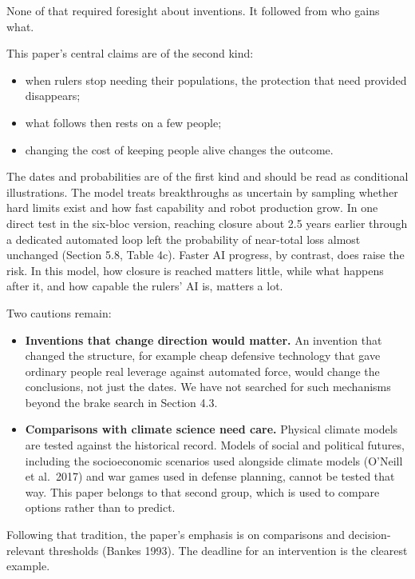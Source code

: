 \documentclass[
  10pt,
]{article}
\providecommand{\tightlist}{%
  \setlength{\itemsep}{0pt}\setlength{\parskip}{0pt}}
\begin{document}
None of that required foresight about inventions. It followed from who gains what.

This paper's central claims are of the second kind:

\begin{itemize}
\tightlist
\item
  when rulers stop needing their populations, the protection that need provided disappears;
\item
  what follows then rests on a few people;
\item
  changing the cost of keeping people alive changes the outcome.
\end{itemize}

The dates and probabilities are of the first kind and should be read as conditional illustrations.
The model treats breakthroughs as uncertain by sampling whether hard limits exist and how fast
capability and robot production grow. In one direct test in the six-bloc version, reaching closure
about 2.5 years earlier through a dedicated automated loop left the probability of near-total loss
almost unchanged (Section 5.8, Table 4c). Faster AI progress, by contrast, does raise the risk. In
this model, how closure is reached matters little, while what happens after it, and how capable the
rulers' AI is, matters a lot.

Two cautions remain:

\begin{itemize}
\tightlist
\item
  \textbf{Inventions that change direction would matter.} An invention that changed the structure,
  for example cheap defensive technology that gave ordinary people real leverage against automated
  force, would change the conclusions, not just the dates. We have not searched for such mechanisms
  beyond the brake search in Section 4.3.
\item
  \textbf{Comparisons with climate science need care.} Physical climate models are tested against
  the historical record. Models of social and political futures, including the socioeconomic
  scenarios used alongside climate models (O'Neill et al.~2017) and war games used in defense
  planning, cannot be tested that way. This paper belongs to that second group, which is used to
  compare options rather than to predict.
\end{itemize}

Following that tradition, the paper's emphasis is on comparisons and decision-relevant thresholds
(Bankes 1993). The deadline for an intervention is the clearest example.
\end{document}
